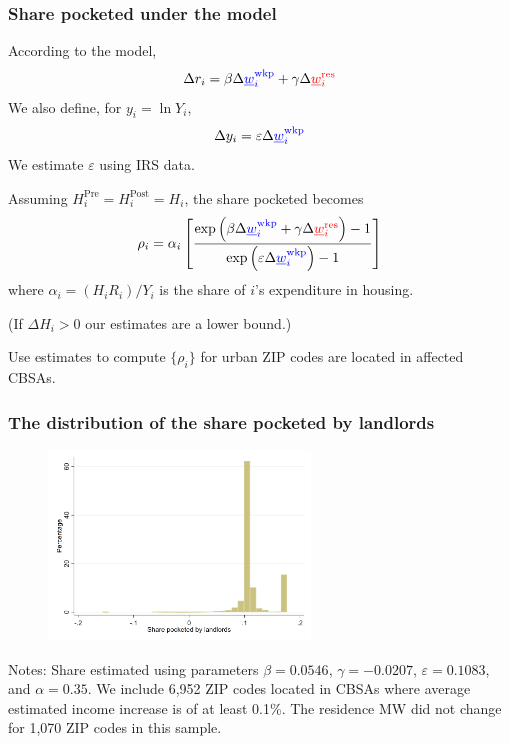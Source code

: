 \documentclass[aspectratio=169, t]{beamer}
\newcommand{\mw}{\underline{w}}
\newcommand{\wkp}{\text{wkp}}
\newcommand{\res}{\text{res}}
\newcommand{\pre}{\text{Pre}}
\newcommand{\post}{\text{Post}}
\begin{document}
\begin{frame}[label = share_pocketed_model]
    \frametitle{Share pocketed under the model}

    According to the model,
    $$
    \Delta r_i = \beta \Delta {\color{blue}\mw_i^{\wkp}} + \gamma \Delta {\color{red}\mw_i^{\res}}
    $$
    We also define, for $y_i = \ln Y_i$,
    $$
    \Delta y_i = \varepsilon \Delta {\color{blue}\mw_i^{\wkp}}
    $$
    We estimate $\varepsilon$ using IRS data. \hyperlink{wages_results}{}

    \pause
    \vspace{3mm}
    Assuming $H^{\pre}_i = H^{\post}_i = H_i$, the share pocketed becomes
    \begin{equation*}
        \rho_i = \alpha_i \left[
                  \frac{\exp \left( \beta \Delta {\color{blue}\mw_i^{\wkp}} 
                                 + \gamma \Delta {\color{red}\mw_i^{\res}} \right) - 1 }
                       {\exp \left( \varepsilon \Delta {\color{blue}\mw_i^{\wkp}}  \right) - 1 }
                         \right]
    \end{equation*}
    where $\alpha_i = \left(H_i R_i\right)/Y_i$ is the share of $i$'s expenditure in housing.
    
    {\small (If $\Delta H_i > 0$ our estimates are a lower bound.)}

    \pause
    \vspace{3mm}
    Use estimates to compute $\{\rho_i\}$ for urban ZIP codes are located in affected CBSAs.
\end{frame}

\begin{frame}
    \frametitle{The distribution of the share pocketed by landlords}
    
    \vspace{1mm}
    \begin{figure}
        \centering
        \includegraphics[width = 0.62\textwidth]{counterfactuals/output/hist_rho.png}
    \end{figure}   

    \vspace{-1mm}
    \scriptsize
    Notes: Share estimated using parameters $\beta = 0.0546$, $\gamma = -0.0207$, $\varepsilon = 0.1083$, and $\alpha=0.35$.
    We include 6,952 ZIP codes located in CBSAs where average estimated income increase
    is of at least 0.1\%. 
    The residence MW did not change for 1,070 ZIP codes in this sample.
\end{frame}
\end{document}
